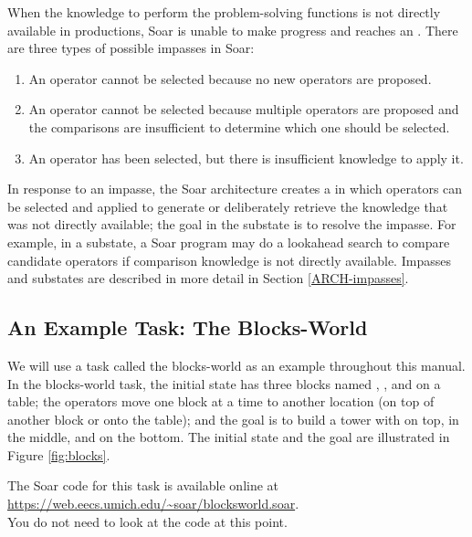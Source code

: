 When the knowledge to perform the problem-solving functions is not
directly available in productions, Soar is unable to make progress and
reaches an .  There are three types of possible impasses
in Soar:
\begin{enumerate}
\item An operator cannot be selected because no new operators are proposed.\vspace{-4pt}
\item An operator cannot be selected because multiple operators are
        proposed and the comparisons are insufficient to determine which
        one should be selected.\vspace{-4pt}
\item An operator has been selected, but there is insufficient knowledge
        to apply it.\vspace{-4pt}
\end{enumerate}
In response to an impasse, the Soar architecture creates a
 in which operators can be selected and applied to
generate or deliberately retrieve the knowledge that was not directly
available; the goal in the substate is to resolve the impasse. For
example, in a substate, a Soar program may do a lookahead search to
compare candidate operators if comparison knowledge is not directly
available.  Impasses and substates are described in more detail in Section \ref{ARCH-impasses}.


\subsection{An Example Task: The Blocks-World}

We will use a task called the blocks-world as an example throughout this
manual. In the blocks-world task, the initial state has three blocks named
, , and  on a table; the operators move one block at a
time to another location (on top of another block or onto the table); and the
goal is to build a tower with  on top,  in the middle, and
 on the bottom. The initial state and the goal are illustrated in
Figure \ref{fig:blocks}.

The Soar code for this task is available online at \\
\url{https://web.eecs.umich.edu/~soar/blocksworld.soar}. \\
You do not need to look at the code at this point.

